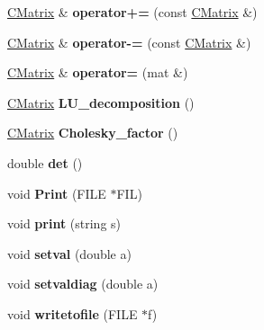 \begin{DoxyCompactItemize}
\item 
\mbox{\label{class_c_matrix_ad4948d1fa05cd35a14da2630a5847e77}} 
\hyperlink{class_c_matrix}{C\+Matrix} \& {\bfseries operator+=} (const \hyperlink{class_c_matrix}{C\+Matrix} \&)
\item 
\mbox{\label{class_c_matrix_a64adc1d595e8684b44056a2cb81d7ccd}} 
\hyperlink{class_c_matrix}{C\+Matrix} \& {\bfseries operator-\/=} (const \hyperlink{class_c_matrix}{C\+Matrix} \&)
\item 
\mbox{\label{class_c_matrix_ab7afcd412c033df1b750c9ce1c2a66d1}} 
\hyperlink{class_c_matrix}{C\+Matrix} \& {\bfseries operator=} (mat \&)
\item 
\mbox{\label{class_c_matrix_ae3cf1d057c575d74b5c3bbd2d4383ba3}} 
\hyperlink{class_c_matrix}{C\+Matrix} {\bfseries L\+U\+\_\+decomposition} ()
\item 
\mbox{\label{class_c_matrix_a947f960dc2f36e79278a0d57ada045df}} 
\hyperlink{class_c_matrix}{C\+Matrix} {\bfseries Cholesky\+\_\+factor} ()
\item 
\mbox{\label{class_c_matrix_a05e14a79923dbf6f86f3e78095005d5f}} 
double {\bfseries det} ()
\item 
\mbox{\label{class_c_matrix_a1f414340c1de9db5d298a2f694200ee9}} 
void {\bfseries Print} (F\+I\+LE $\ast$F\+IL)
\item 
\mbox{\label{class_c_matrix_a18d50620c4179d228ffdf67004e92dc8}} 
void {\bfseries print} (string s)
\item 
\mbox{\label{class_c_matrix_ac9441f102fbbfeb82800d31578923e02}} 
void {\bfseries setval} (double a)
\item 
\mbox{\label{class_c_matrix_ae4168ddcc81de630b034ad16cec955b7}} 
void {\bfseries setvaldiag} (double a)
\item 
\mbox{\label{class_c_matrix_a163544db14dead815ba07b203845896a}} 
void {\bfseries writetofile} (F\+I\+LE $\ast$f)
\item 

\end{DoxyCompactItemize}

